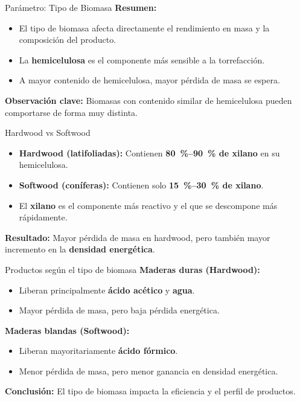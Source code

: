 \documentclass[main.tex]{subfiles}
\begin{document}
\begin{frame}{Parámetro: Tipo de Biomasa}
\textbf{Resumen:}
\begin{itemize}
  \item El tipo de biomasa afecta directamente el rendimiento en masa y la composición del producto.
  \item La \textbf{hemicelulosa} es el componente más sensible a la torrefacción.
  \item A mayor contenido de hemicelulosa, mayor pérdida de masa se espera.
\end{itemize}
\vspace{0.5em}
\textbf{Observación clave:}
Biomasas con contenido similar de hemicelulosa pueden comportarse de forma muy distinta.
\end{frame}

\begin{frame}{Hardwood vs Softwood}
\begin{itemize}
  \item \textbf{Hardwood (latifoliadas):}
  Contienen \textbf{\SIrange{80}{90}{\percent} de xilano} en su hemicelulosa.
  \item \textbf{Softwood (coníferas):}
  Contienen solo \textbf{\SIrange{15}{30}{\percent} de xilano}.
  \item El \textbf{xilano} es el componente más reactivo y el que se descompone más rápidamente.
\end{itemize}
\vspace{0.5em}
\textbf{Resultado:}
Mayor pérdida de masa en hardwood, pero también mayor incremento en la \textbf{densidad energética}.
\end{frame}

\begin{frame}{Productos según el tipo de biomasa}
\textbf{Maderas duras (Hardwood):}
\begin{itemize}
  \item Liberan principalmente \textbf{ácido acético} y \textbf{agua}.
  \item Mayor pérdida de masa, pero baja pérdida energética.
\end{itemize}
\textbf{Maderas blandas (Softwood):}
\begin{itemize}
  \item Liberan mayoritariamente \textbf{ácido fórmico}.
  \item Menor pérdida de masa, pero menor ganancia en densidad energética.
\end{itemize}
\vspace{0.5em}
\textbf{Conclusión:}
El tipo de biomasa impacta la eficiencia y el perfil de productos.
\end{frame}
\end{document}
